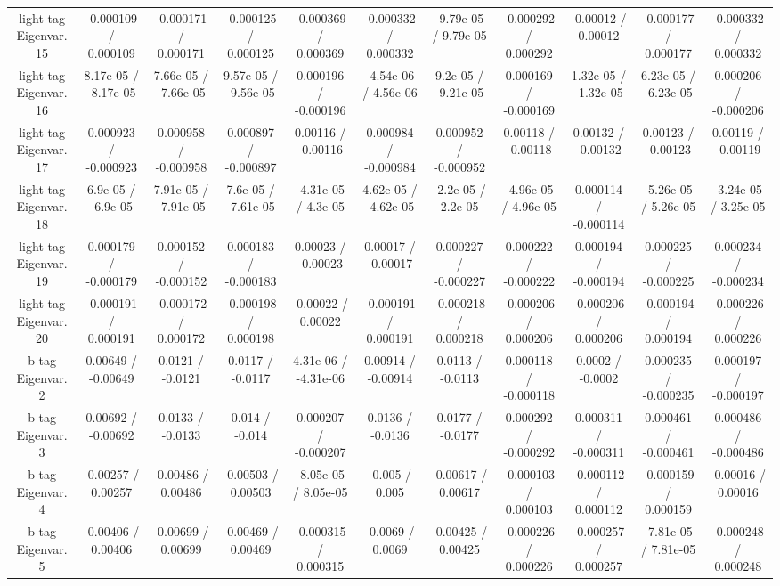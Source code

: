 \begin{table}[htbp]
\begin{center}
\begin{tabular}{|c|c|c|c|c|c|c|c|c|c|c|}
  light-tag Eigenvar. 15 & -0.000109 / 0.000109 & -0.000171 / 0.000171 & -0.000125 / 0.000125 & -0.000369 / 0.000369 & -0.000332 / 0.000332 & -9.79e-05 / 9.79e-05 & -0.000292 / 0.000292 & -0.00012 / 0.00012 & -0.000177 / 0.000177 & -0.000332 / 0.000332 \\ 
  light-tag Eigenvar. 16 & 8.17e-05 / -8.17e-05 & 7.66e-05 / -7.66e-05 & 9.57e-05 / -9.56e-05 & 0.000196 / -0.000196 & -4.54e-06 / 4.56e-06 & 9.2e-05 / -9.21e-05 & 0.000169 / -0.000169 & 1.32e-05 / -1.32e-05 & 6.23e-05 / -6.23e-05 & 0.000206 / -0.000206 \\ 
  light-tag Eigenvar. 17 & 0.000923 / -0.000923 & 0.000958 / -0.000958 & 0.000897 / -0.000897 & 0.00116 / -0.00116 & 0.000984 / -0.000984 & 0.000952 / -0.000952 & 0.00118 / -0.00118 & 0.00132 / -0.00132 & 0.00123 / -0.00123 & 0.00119 / -0.00119 \\ 
  light-tag Eigenvar. 18 & 6.9e-05 / -6.9e-05 & 7.91e-05 / -7.91e-05 & 7.6e-05 / -7.61e-05 & -4.31e-05 / 4.3e-05 & 4.62e-05 / -4.62e-05 & -2.2e-05 / 2.2e-05 & -4.96e-05 / 4.96e-05 & 0.000114 / -0.000114 & -5.26e-05 / 5.26e-05 & -3.24e-05 / 3.25e-05 \\ 
  light-tag Eigenvar. 19 & 0.000179 / -0.000179 & 0.000152 / -0.000152 & 0.000183 / -0.000183 & 0.00023 / -0.00023 & 0.00017 / -0.00017 & 0.000227 / -0.000227 & 0.000222 / -0.000222 & 0.000194 / -0.000194 & 0.000225 / -0.000225 & 0.000234 / -0.000234 \\ 
  light-tag Eigenvar. 20 & -0.000191 / 0.000191 & -0.000172 / 0.000172 & -0.000198 / 0.000198 & -0.00022 / 0.00022 & -0.000191 / 0.000191 & -0.000218 / 0.000218 & -0.000206 / 0.000206 & -0.000206 / 0.000206 & -0.000194 / 0.000194 & -0.000226 / 0.000226 \\ 
  b-tag Eigenvar. 2 & 0.00649 / -0.00649 & 0.0121 / -0.0121 & 0.0117 / -0.0117 & 4.31e-06 / -4.31e-06 & 0.00914 / -0.00914 & 0.0113 / -0.0113 & 0.000118 / -0.000118 & 0.0002 / -0.0002 & 0.000235 / -0.000235 & 0.000197 / -0.000197 \\ 
  b-tag Eigenvar. 3 & 0.00692 / -0.00692 & 0.0133 / -0.0133 & 0.014 / -0.014 & 0.000207 / -0.000207 & 0.0136 / -0.0136 & 0.0177 / -0.0177 & 0.000292 / -0.000292 & 0.000311 / -0.000311 & 0.000461 / -0.000461 & 0.000486 / -0.000486 \\ 
  b-tag Eigenvar. 4 & -0.00257 / 0.00257 & -0.00486 / 0.00486 & -0.00503 / 0.00503 & -8.05e-05 / 8.05e-05 & -0.005 / 0.005 & -0.00617 / 0.00617 & -0.000103 / 0.000103 & -0.000112 / 0.000112 & -0.000159 / 0.000159 & -0.00016 / 0.00016 \\ 
  b-tag Eigenvar. 5 & -0.00406 / 0.00406 & -0.00699 / 0.00699 & -0.00469 / 0.00469 & -0.000315 / 0.000315 & -0.0069 / 0.0069 & -0.00425 / 0.00425 & -0.000226 / 0.000226 & -0.000257 / 0.000257 & -7.81e-05 / 7.81e-05 & -0.000248 / 0.000248 \\ 

\end{tabular}
\end{center}
\end{table}
